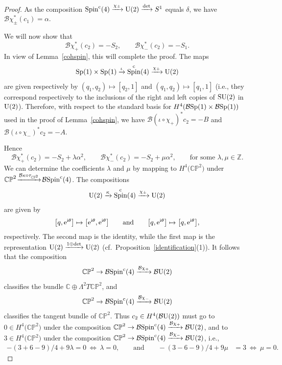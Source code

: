 \documentclass[pdftex]{sigma}%
\newcommand{\CP}{\mathbb{CP}}
\newcommand{\Z}{\mathbb{Z}}
\newcommand{\C}{\mathbb{C}}
\DeclareMathOperator{\Spin}{Spin}
\numberwithin{equation}{section}
\begin{document}
\begin{proof}
As the composition $\Spin^{\rm c}(4) \xrightarrow{\chi_\pm} {\rm U}(2) \xrightarrow{\det} S^1 $
equals $\delta$, we have ${\mathcal B}\chi_{\pm}^*(c_1) = \alpha$.

We will now show that
\[ {\mathcal B}\chi_+^*(c_2) =-S_2, \qquad {\mathcal B}\chi_-^*(c_2)=-S_1.\]
In view of Lemma~\ref{cohspin}, this will complete the proof. The maps
\[
{\rm Sp}(1) \times {\rm Sp}(1) \xrightarrow{\iota} \Spin^{\rm c}(4) \xrightarrow{\chi_\pm} {\rm U}(2)
\]
are given respectively by $(q_1,q_2) \mapsto [q_2,1]$ and $(q_1,q_2) \mapsto [q_1,1]$ (i.e., they correspond respectively to
the inclusions of the right and left copies of ${\rm SU}(2)$ in ${\rm U}(2)$). Therefore, with respect to the standard basis for $H^4 ({\mathcal B}{\rm Sp}(1)\times {\mathcal B}{\rm Sp}(1))$ used in the proof of Lemma~\ref{cohspin}, we
have ${\mathcal B}(\iota \circ \chi_+)^*c_2 = -B$ and ${\mathcal B}(\iota\circ \chi_-)^*c_2 =-A$.

Hence
\[
{\mathcal B}\chi_+^*(c_2) = -S_2 + \lambda \alpha^2, \qquad {\mathcal B}\chi_-^*(c_2) = -S_2 + \mu \alpha^2, \qquad \text{for some } \lambda, \mu \in \Z.
\]
We can determine the coefficients $\lambda$ and $\mu$ by mapping to $H^4\big(\CP^2\big)$ under $\CP^2 \! \xrightarrow{{\mathcal B}\kappa \circ \tau_{\CP^2}} \! {\mathcal B}{\rm Spin}^{\rm c}(4)$.
The compositions
\[ {\rm U}(2) \xrightarrow{\kappa} \Spin^{\rm c}(4) \xrightarrow{\chi_{\pm}} {\rm U}(2) \]
are given by
\[
\big[q, {\rm e}^{{\rm i}\theta}\big] \mapsto \big[{\rm e}^{{\rm i}\theta},{\rm e}^{{\rm i}\theta}\big] \qquad \text{and} \qquad \big[q, {\rm e}^{{\rm i}\theta}\big] \mapsto \big[q,{\rm e}^{{\rm i}\theta}\big],
\]
respectively. The second map is the identity, while the first map is the representation ${\rm U}(2) \xrightarrow{ 1\oplus \det } {\rm U}(2)$ (cf.\ Proposition~\ref{identification}(1)).
It follows that the composition
\[ \CP^2 \to {\mathcal B}{\rm Spin}^{\rm c}(4) \xrightarrow{{\mathcal B}\chi_+} {\mathcal B}{\rm U}(2) \]
classifies the bundle $\C \oplus \Lambda^2 T\CP^2$, and
\[ \CP^2 \to {\mathcal B}{\rm Spin}^{\rm c}(4) \xrightarrow{{\mathcal B}\chi_-} {\mathcal B}{\rm U}(2) \]
classifies the tangent bundle of $\CP^2$. Thus $c_2 \in H^4({\mathcal B}{\rm U}(2))$ must go to $0 \in H^4\big(\CP^2\big)$ under the composition $\CP^2 \to {\mathcal B}{\rm Spin}^{\rm c}(4) \xrightarrow{{\mathcal B}\chi_+} {\mathcal B}{\rm U}(2)$, and to $3\in H^4\big(\CP^2\big)$
under the composition $\CP^2 \to {\mathcal B}{\rm Spin}^{\rm c}(4) \xrightarrow{{\mathcal B}\chi_-} {\mathcal B}{\rm U}(2)$, i.e.,
\begin{align*}
- (3 + 6 - 9)/4 + 9 \lambda = 0 \ \Leftrightarrow \ \lambda=0, \qquad\! \mathrm{and} \qquad\! {-}(3-6-9)/4 + 9\mu &= 3 \ \Leftrightarrow \ \mu = 0.\!\!\!\tag*{\qed}
 \end{align*}\renewcommand{\qed}{}
\end{proof}
\end{document}
